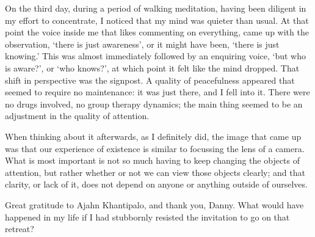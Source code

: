 On the third day, during a period of walking meditation, having been
diligent in my effort to concentrate, I noticed that my mind was quieter
than usual. At that point the voice inside me that likes commenting on
everything, came up with the observation, `there is just awareness', or
it might have been, `there is just knowing.' This was almost
immediately followed by an enquiring voice, `but who is aware?', or `who
knows?', at which point it felt like the mind dropped. That shift
in perspective was the signpost. A quality of peacefulness appeared that
seemed to require no maintenance: it was just there, and I fell into it.
There were no drugs involved, no group therapy dynamics; the main thing
seemed to be an adjustment in the quality of attention.

When thinking about it afterwards, as I definitely did, the image that
came up was that our experience of existence is similar to focussing the
lens of a camera. What is most important is not so much having to keep
changing the objects of attention, but rather whether or not we can view
those objects clearly; and that clarity, or lack of it, does not depend
on anyone or anything outside of ourselves.

Great gratitude to Ajahn Khantipalo, and thank you, Danny. What would
have happened in my life if I had stubbornly resisted the invitation to
go on that retreat?

